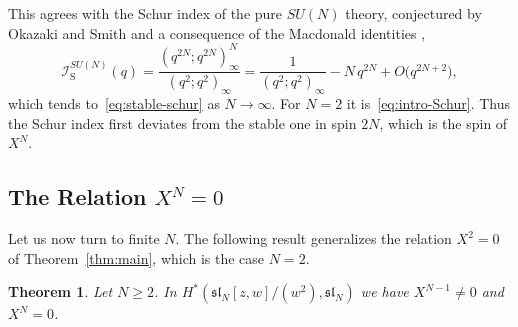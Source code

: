 \documentclass[11pt]{amsart}
\numberwithin{equation}{section}
\newtheorem{theorem}{Theorem}[section]
\theoremstyle{definition}
\theoremstyle{remark}
\begin{document}
This agrees with the Schur index of the pure $SU(N)$ theory, conjectured by Okazaki and Smith \cite{OS24} and a consequence of the Macdonald identities \cite{Mac72},
\begin{equation}\label{eq:Lu}
\mathcal I_{\mathrm S}^{SU(N)}(q)=\frac{(q^{2N};q^{2N})_\infty^N}{(q^2;q^2)_\infty}=\frac1{(q^2;q^2)_\infty}-N\,q^{2N}+O\bigl(q^{2N+2}\bigr),
\end{equation}
which tends to~\eqref{eq:stable-schur} as $N\to\infty$. For $N=2$ it is~\eqref{eq:intro-Schur}. Thus the Schur index first deviates from the stable one in spin $2N$, which is the spin of $X^N$.

\subsection{The Relation \texorpdfstring{$X^N=0$}{X\^{}N=0}}\label{subsec:XN}
Let us now turn to finite $N$. The following result generalizes the relation $X^2=0$ of Theorem~\ref{thm:main}, which is the case $N=2$.

\begin{theorem}\label{prop:XN}
Let $N\ge2$. In $H^*(\mathfrak{sl}_N[z,w]/(w^2),\mathfrak{sl}_N)$ we have $X^{N-1}\ne0$ and $X^N=0$.
\end{theorem}
\end{document}
